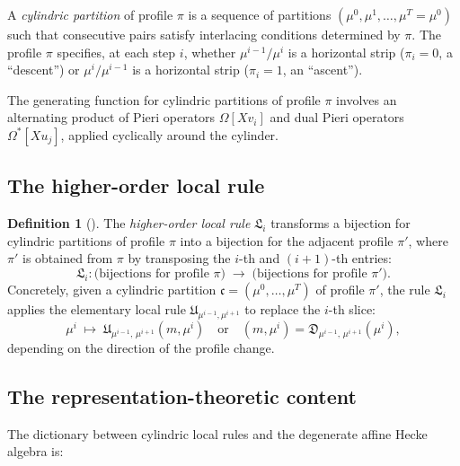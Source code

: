\documentclass[12pt,a4paper]{article}
\theoremstyle{definition}
\newtheorem{definition}[theorem]{Definition}
\theoremstyle{remark}
\newcommand{\fU}{\mathfrak{U}}
\newcommand{\fD}{\mathfrak{D}}
\newcommand{\fL}{\mathfrak{L}}
\begin{document}
A \emph{cylindric partition} of profile $\pi$ is a sequence of
partitions $(\mu^0, \mu^1, \ldots, \mu^T = \mu^0)$ such that
consecutive pairs satisfy interlacing conditions determined by
$\pi$. The profile $\pi$ specifies, at each step $i$, whether
$\mu^{i-1}/\mu^i$ is a horizontal strip ($\pi_i = 0$, a
``descent'') or $\mu^i/\mu^{i-1}$ is a horizontal strip
($\pi_i = 1$, an ``ascent'').

The generating function for cylindric partitions of profile $\pi$
involves an alternating product of Pieri operators
$\Omega[Xv_i]$ and dual Pieri operators $\Omega^*[Xu_j]$, applied
cyclically around the cylinder.

\subsection{The higher-order local rule}

\begin{definition}[\cite{Langer}]
The \emph{higher-order local rule} $\fL_i$ transforms a bijection
for cylindric partitions of profile $\pi$ into a bijection for
the adjacent profile $\pi'$, where $\pi'$ is obtained from $\pi$ by
transposing the $i$-th and $(i{+}1)$-th entries:
\[
  \fL_i : \bigl(\text{bijections for profile } \pi\bigr)
  \;\longrightarrow\;
  \bigl(\text{bijections for profile } \pi'\bigr).
\]
Concretely, given a cylindric partition
$\mathfrak{c} = (\mu^0, \ldots, \mu^T)$ of profile $\pi'$,
the rule $\fL_i$ applies the elementary local rule
$\fU_{\mu^{i-1}, \mu^{i+1}}$ to replace the $i$-th slice:
\[
  \mu^i \;\longmapsto\; \fU_{\mu^{i-1},\, \mu^{i+1}}(m, \mu^i)
  \quad\text{or}\quad
  (m, \mu^i) = \fD_{\mu^{i-1},\, \mu^{i+1}}(\mu^i),
\]
depending on the direction of the profile change.
\end{definition}

\subsection{The representation-theoretic content}

The dictionary between cylindric local rules and the degenerate affine
Hecke algebra is:
\end{document}
